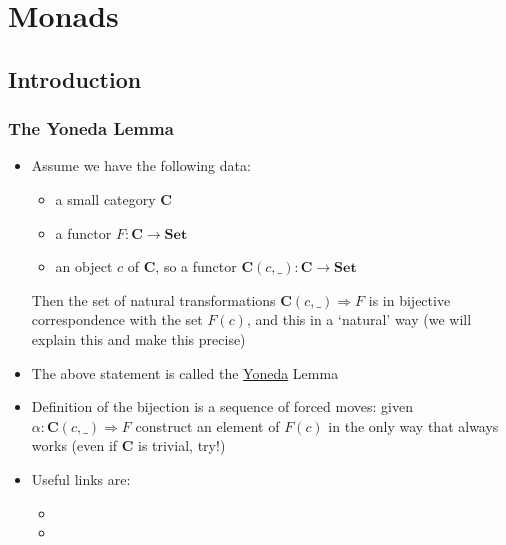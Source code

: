 \documentclass[handout]{beamer}
\title[INF223 presentations]{}
\newcommand{\To}{\Rightarrow}
\newcommand{\bfsf}[1]{{\boldsymbol{#1}}}
\newcommand{\Set}{\bfsf{Set}}
\newcommand{\CC}{\bfsf{C}}
\begin{document}
\section{Monads}
\subsection{Introduction}
 
\frame
  {   
    \frametitle{The Yoneda Lemma}\label{Yon:Intro}

 \begin{itemize}[<+->]
\item Assume we have the following data:
\begin{itemize}
    \item a small category $\CC$
    \item a functor $F:\CC\to\Set$
    \item an object $c$ of $\CC$, so a functor $\CC(c,\_):\CC\to\Set$
 \end{itemize}
Then the set of natural transformations $\CC(c,\_)\To F$ is in bijective
correspondence with the set $F(c)$, and this in a `natural' way
(we will explain this and make this precise)
\item The above statement is called the 
\href{https://en.wikipedia.org/wiki/Nobuo_Yoneda}{\color{blue}Yoneda} Lemma
\item Definition of the bijection is a sequence of forced moves: given $\alpha: \CC(c,\_)\To F$
construct an element of  $F(c)$ in the only way that always works (even if $\CC$ is trivial,
{\color{red}try}!)
\item Useful links are:
 \begin{itemize}
    \item {}
    \item {}
 \end{itemize}
 \end{itemize}

 }
\end{document}
